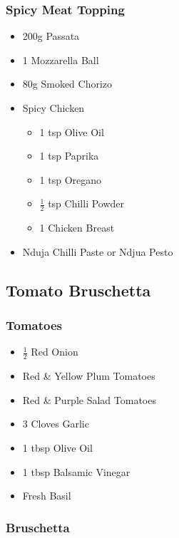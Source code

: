 \documentclass[11pt, english]{article}
\begin{document}
		\subsubsection*{Spicy Meat Topping}
	
	\begin{itemize}
        \setlength\itemsep{0cm}
                \item 200g Passata
		\item 1 Mozzarella Ball
		\item 80g Smoked Chorizo
		\item Spicy Chicken 
		\begin{itemize}
			\item 1 tsp Olive Oil
			\item 1 tsp Paprika
			\item 1 tsp Oregano
			\item $\frac{1}{2}$ tsp Chilli Powder
			\item 1 Chicken Breast
		\end{itemize}
		\item Nduja Chilli Paste or Ndjua Pesto
        \end{itemize}

\newpage

	\subsection{Tomato Bruschetta}

		\subsubsection*{Tomatoes}

	\begin{itemize}
        \setlength\itemsep{0cm}
		\item $\frac{1}{2}$ Red Onion
		\item Red \& Yellow Plum Tomatoes
		\item Red \& Purple Salad Tomatoes
		\item 3 Cloves Garlic
		\item 1 tbsp Olive Oil
		\item 1 tbsp Balsamic Vinegar
		\item Fresh Basil
        \end{itemize}

		\subsubsection*{Bruschetta}
\end{document}
